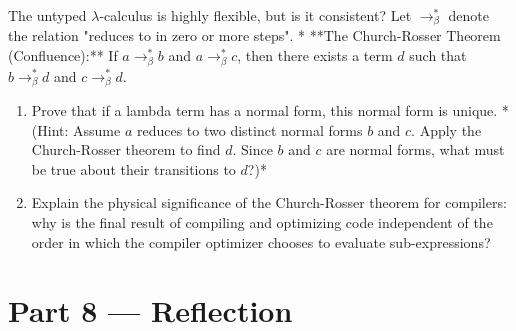 \documentclass[12pt, a4paper]{book}
\begin{document}
\begin{deepbox}
\begin{enumerate}[label=\textbf{D\arabic*.}]
        The untyped $\lambda$-calculus is highly flexible, but is it consistent?
        Let $\to_\beta^*$ denote the relation "reduces to in zero or more steps".
        * **The Church-Rosser Theorem (Confluence):** If $a \to_\beta^* b$ and $a \to_\beta^* c$, then there exists a term $d$ such that $b \to_\beta^* d$ and $c \to_\beta^* d$.
        
        \begin{center}
        \end{center}
        
        \begin{enumerate}[label=(\alph*)]
          \item Prove that if a lambda term has a normal form, this normal form is unique.
                *(Hint: Assume $a$ reduces to two distinct normal forms $b$ and $c$. Apply the Church-Rosser theorem to find $d$. Since $b$ and $c$ are normal forms, what must be true about their transitions to $d$?)*
          \item Explain the physical significance of the Church-Rosser theorem for compilers: why is the final result of compiling and optimizing code independent of the order in which the compiler optimizer chooses to evaluate sub-expressions?
        \end{enumerate}
\end{enumerate}
\end{deepbox}

\newpage

\section{Part 8 --- Reflection}
\end{document}
